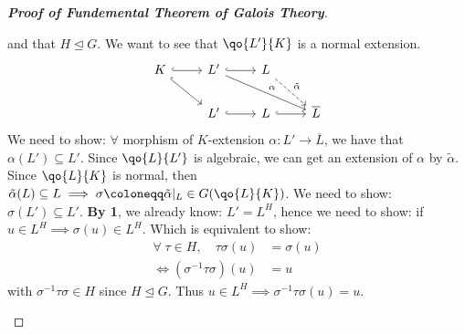 \begin{proof}[\textbf{Proof of Fundemental Theorem of Galois Theory}]
\begin{enumerate}
		      and that \( H \trianglelefteq G \). We want to see that \( \qo{L'}{K} \) is a normal extension.
		      \[
			      \begin{tikzcd}
				      K \arrow[r,hook] \arrow[rd, hook] & L' \arrow[r,hook] \arrow[rrd, "\alpha"] & L
				      \arrow[dashed, rd, "\tilde{\alpha}"] & \\
				      & L' \arrow[r,hook] & L \arrow[r,hook] &
				      \overline{L}
			      \end{tikzcd}
		      \]
		      We need to show: \( \forall \) morphism of \( K \)-extension \( \alpha: L' \to \overline{L} \), we have
		      that \( \alpha(L') \subseteq L' \). Since \( \qo{L}{L'} \) is algebraic, we can get an
		      extension of \( \alpha \) by \( \tilde{\alpha} \). Since \( \qo{L}{K} \) is normal, then
		      \( \tilde{\alpha}(L) \subseteq L \implies \sigma\coloneqq  \tilde{\alpha}|_{L} \in G(\qo{L}{K})  \). We
		      need to show: \( \sigma(L') \subseteq L' \). \textbf{By 1}, we already know: \( L' = L^H \), hence we need to
		      show: if \( u \in L^H \implies \sigma(u) \in L^H \). Which is equivalent to show:
		      \[
			      \begin{aligned}
				      \forall \; \tau \in H,              \quad  \tau \sigma (u) & = \sigma (u) \\
				      \iff (\sigma ^{-1}\tau \sigma )(u)                         & = u
			      \end{aligned}
		      \]
		      with \( \sigma^{-1} \tau \sigma \in H \) since \( H \trianglelefteq G \). Thus \( u\in L^H
		      \implies \sigma^{-1} \tau \sigma(u) = u\).
	\end{enumerate}
\end{proof}


